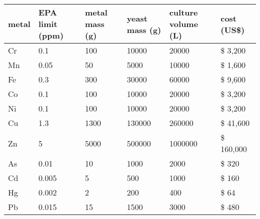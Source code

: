 \begin{tabular}{L{1cm}L{1.8cm}L{2.2cm}L{2cm}L{1.8cm}l}
  \toprule
    metal
    & EPA limit (ppm)
    & metal mass (g)
    & yeast mass (g)
    & culture volume (L)
    & cost (US\$) \\
  \midrule
    Cr & 0.1 & 100 & 10000 & 20000 & \$ 3,200 \\
    Mn & 0.05 & 50 & 5000 & 10000 & \$ 1,600 \\
    Fe & 0.3 & 300 & 30000 & 60000 & \$ 9,600 \\
    Co\protect\footnotemark & 0.1 & 100 & 10000 & 20000 & \$ 3,200 \\
    Ni & 0.1 & 100 & 10000 & 20000 & \$ 3,200 \\
    Cu & 1.3 & 1300 & 130000 & 260000 & \$ 41,600 \\
    Zn & 5 & 5000 & 500000 & 1000000 & \$ 160,000 \\
    As & 0.01 & 10 & 1000 & 2000 & \$ 320 \\
    Cd & 0.005 & 5 & 500 & 1000 & \$ 160 \\
    Hg & 0.002 & 2 & 200 & 400 & \$ 64 \\
    Pb & 0.015 & 15 & 1500 & 3000 & \$ 480 \\
  \bottomrule
\end{tabular}
